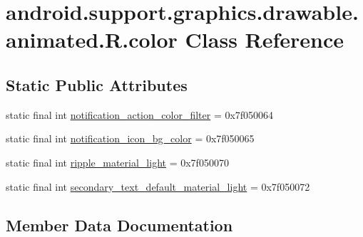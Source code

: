 \hypertarget{classandroid_1_1support_1_1graphics_1_1drawable_1_1animated_1_1R_1_1color}{}\section{android.\+support.\+graphics.\+drawable.\+animated.\+R.\+color Class Reference}
\label{classandroid_1_1support_1_1graphics_1_1drawable_1_1animated_1_1R_1_1color}
\subsection*{Static Public Attributes}
\begin{DoxyCompactItemize}
\item 
static final int \mbox{\hyperlink{classandroid_1_1support_1_1graphics_1_1drawable_1_1animated_1_1R_1_1color_a7eb2572a53f41b68420968c7753166b2}{notification\+\_\+action\+\_\+color\+\_\+filter}} = 0x7f050064
\item 
static final int \mbox{\hyperlink{classandroid_1_1support_1_1graphics_1_1drawable_1_1animated_1_1R_1_1color_ac42fd8da7e38496255aa78facac71060}{notification\+\_\+icon\+\_\+bg\+\_\+color}} = 0x7f050065
\item 
static final int \mbox{\hyperlink{classandroid_1_1support_1_1graphics_1_1drawable_1_1animated_1_1R_1_1color_a140821658e27ded4fbb22ed969645636}{ripple\+\_\+material\+\_\+light}} = 0x7f050070
\item 
static final int \mbox{\hyperlink{classandroid_1_1support_1_1graphics_1_1drawable_1_1animated_1_1R_1_1color_aaabd20902a0ff6aa59bf6aca1a7a6751}{secondary\+\_\+text\+\_\+default\+\_\+material\+\_\+light}} = 0x7f050072
\end{DoxyCompactItemize}


\subsection{Member Data Documentation}
\mbox{\label{classandroid_1_1support_1_1graphics_1_1drawable_1_1animated_1_1R_1_1color_a7eb2572a53f41b68420968c7753166b2}} 
